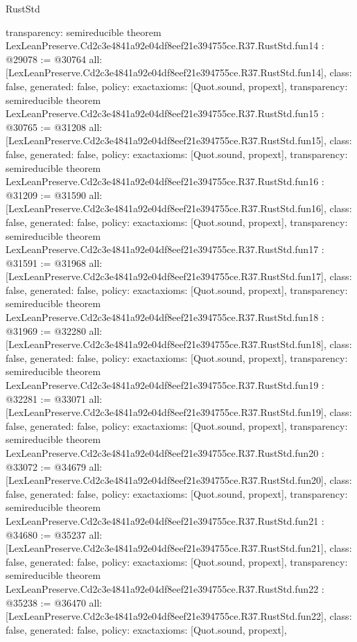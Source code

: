 \begin{lexlean}{RustStd}
\begin{coremodule}
{  transparency: semireducible
}
theorem LexLeanPreserve.Cd2c3e4841a92e04df8eef21e394755ce.R37.RustStd.fun14 : @29078 := @30764 {
  all: [LexLeanPreserve.Cd2c3e4841a92e04df8eef21e394755ce.R37.RustStd.fun14],
  class: false,
  generated: false,
  policy: exact{axioms: [Quot.sound, propext]},
  transparency: semireducible
}
theorem LexLeanPreserve.Cd2c3e4841a92e04df8eef21e394755ce.R37.RustStd.fun15 : @30765 := @31208 {
  all: [LexLeanPreserve.Cd2c3e4841a92e04df8eef21e394755ce.R37.RustStd.fun15],
  class: false,
  generated: false,
  policy: exact{axioms: [Quot.sound, propext]},
  transparency: semireducible
}
theorem LexLeanPreserve.Cd2c3e4841a92e04df8eef21e394755ce.R37.RustStd.fun16 : @31209 := @31590 {
  all: [LexLeanPreserve.Cd2c3e4841a92e04df8eef21e394755ce.R37.RustStd.fun16],
  class: false,
  generated: false,
  policy: exact{axioms: [Quot.sound, propext]},
  transparency: semireducible
}
theorem LexLeanPreserve.Cd2c3e4841a92e04df8eef21e394755ce.R37.RustStd.fun17 : @31591 := @31968 {
  all: [LexLeanPreserve.Cd2c3e4841a92e04df8eef21e394755ce.R37.RustStd.fun17],
  class: false,
  generated: false,
  policy: exact{axioms: [Quot.sound, propext]},
  transparency: semireducible
}
theorem LexLeanPreserve.Cd2c3e4841a92e04df8eef21e394755ce.R37.RustStd.fun18 : @31969 := @32280 {
  all: [LexLeanPreserve.Cd2c3e4841a92e04df8eef21e394755ce.R37.RustStd.fun18],
  class: false,
  generated: false,
  policy: exact{axioms: [Quot.sound, propext]},
  transparency: semireducible
}
theorem LexLeanPreserve.Cd2c3e4841a92e04df8eef21e394755ce.R37.RustStd.fun19 : @32281 := @33071 {
  all: [LexLeanPreserve.Cd2c3e4841a92e04df8eef21e394755ce.R37.RustStd.fun19],
  class: false,
  generated: false,
  policy: exact{axioms: [Quot.sound, propext]},
  transparency: semireducible
}
theorem LexLeanPreserve.Cd2c3e4841a92e04df8eef21e394755ce.R37.RustStd.fun20 : @33072 := @34679 {
  all: [LexLeanPreserve.Cd2c3e4841a92e04df8eef21e394755ce.R37.RustStd.fun20],
  class: false,
  generated: false,
  policy: exact{axioms: [Quot.sound, propext]},
  transparency: semireducible
}
theorem LexLeanPreserve.Cd2c3e4841a92e04df8eef21e394755ce.R37.RustStd.fun21 : @34680 := @35237 {
  all: [LexLeanPreserve.Cd2c3e4841a92e04df8eef21e394755ce.R37.RustStd.fun21],
  class: false,
  generated: false,
  policy: exact{axioms: [Quot.sound, propext]},
  transparency: semireducible
}
theorem LexLeanPreserve.Cd2c3e4841a92e04df8eef21e394755ce.R37.RustStd.fun22 : @35238 := @36470 {
  all: [LexLeanPreserve.Cd2c3e4841a92e04df8eef21e394755ce.R37.RustStd.fun22],
  class: false,
  generated: false,
  policy: exact{axioms: [Quot.sound, propext]},
}
\end{coremodule}
\end{lexlean}
